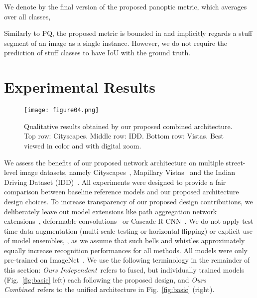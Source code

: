 \documentclass[10pt,twocolumn,letterpaper]{article}
\newcommand{\indep}{\emph{Ours Independent}\xspace}
\newcommand{\joint}{\emph{Ours Combined}\xspace}
\begin{document}
We denote by  the final version of the proposed panoptic metric, which averages  over all classes, \ie

Similarly to PQ, the proposed metric is bounded in  and implicitly regards a stuff segment of an image as a single instance. However, we do not require the prediction of stuff classes to have IoU with the ground truth. 




\section{Experimental Results}
\label{sec:results}

\begin{figure*}
	\centering
	\texttt{[image: figure04.png]}
	\caption{Qualitative results obtained by our proposed combined architecture. Top row: Cityscapes. Middle row: IDD. Bottom row: Vistas. Best viewed in color and with digital zoom.} \label{fig:expresults}
	\vspace{-10pt}
\end{figure*}

We assess the benefits of our proposed network architecture on multiple street-level image datasets, namely Cityscapes~\cite{Cordts2016}, Mapillary Vistas~\cite{Neuhold2017} and the Indian Driving Dataset (IDD)~\cite{Varma19}. 
All experiments were designed to provide a fair comparison between baseline reference models and our proposed architecture design choices. To increase transparency of our proposed design contributions, we deliberately leave out model extensions like path aggregation network extensions~\cite{Liu2018,Chen2018}, deformable convolutions~\cite{Dai2017} or Cascade R-CNN~\cite{Cai2018}. We do not apply test time data augmentation (multi-scale testing or horizontal flipping) or explicit use of model ensembles, \etc, as we assume that such bells and whistles approximately equally increase recognition performances for all methods. All models were only pre-trained on ImageNet~\cite{Rus+15}. We use the following terminology in the remainder of this section: \indep~refers to fused, but individually trained models (Fig.~\ref{fig:basic} left) each following the proposed design, and \joint~refers to the unified architecture in Fig.~\ref{fig:basic} (right). 
\end{document}
